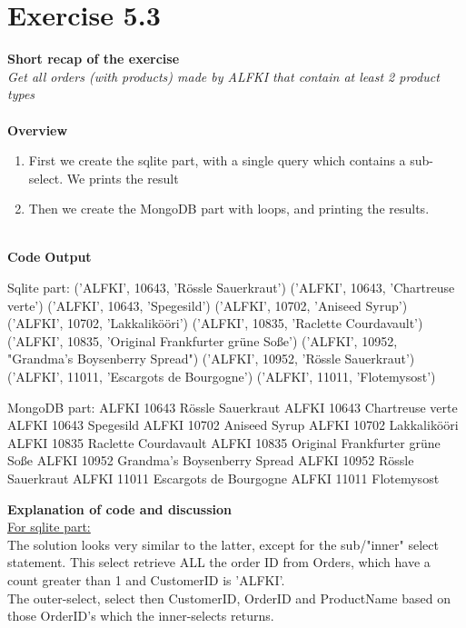 \documentclass{article}
\newcommand\pythonstyle{\lstset{
language=python,
breaklines=true,
basicstyle=\ttfamily\small,
otherkeywords={1, 2, 3, 4, 5, 6, 7, 8 ,9 , 0, -, =, +, [, ], (, \), \{, \}, :, *, !},             %
keywordstyle=\color{blue},
emph={class, pass, in, for, while, if, is, elif, else, not, and, or, OR
    def, print, exec, break, continue, return},
emphstyle=\color{black}\bfseries,
emph={[2]True, False, None, self},
emphstyle=[2]\color{purple},
emph={[3]from, import, as},
emphstyle=[3]\color{blue},
stringstyle=\color{red},
frame=tb,
showstringspaces=false,
morecomment=[s]{"""}{"""},
commentstyle=\color{gray},
rulesepcolor=\color{blue},
title=\lstname
}}
\newcommand\pythonexternal[2][]{{
\pythonstyle
}}
\begin{document}
\section{Exercise 5.3}
\textbf{Short recap of the exercise}\\
\textit{Get all orders (with products) made by ALFKI that contain at least 2 product types}\\
~\\
\textbf{Overview}

\begin{enumerate}
  \item First we create the sqlite part, with a single query which contains a sub-select. We prints the result 
  \item Then we create the MongoDB part with loops, and printing the results. 
\end{enumerate}
~\\
\textbf{Code}
\textbf{Output}
\begin{pythonOutput}
Sqlite part:
('ALFKI', 10643, 'Rössle Sauerkraut')
('ALFKI', 10643, 'Chartreuse verte')
('ALFKI', 10643, 'Spegesild')
('ALFKI', 10702, 'Aniseed Syrup')
('ALFKI', 10702, 'Lakkalikööri')
('ALFKI', 10835, 'Raclette Courdavault')
('ALFKI', 10835, 'Original Frankfurter grüne Soße')
('ALFKI', 10952, "Grandma's Boysenberry Spread")
('ALFKI', 10952, 'Rössle Sauerkraut')
('ALFKI', 11011, 'Escargots de Bourgogne')
('ALFKI', 11011, 'Flotemysost')

MongoDB part:
ALFKI 10643 Rössle Sauerkraut
ALFKI 10643 Chartreuse verte
ALFKI 10643 Spegesild
ALFKI 10702 Aniseed Syrup
ALFKI 10702 Lakkalikööri
ALFKI 10835 Raclette Courdavault
ALFKI 10835 Original Frankfurter grüne Soße
ALFKI 10952 Grandma's Boysenberry Spread
ALFKI 10952 Rössle Sauerkraut
ALFKI 11011 Escargots de Bourgogne
ALFKI 11011 Flotemysost

\end{pythonOutput}
\textbf{Explanation of code and discussion}\\
\underline{For sqlite part:}~\\
The solution looks very similar to the latter, except for the sub/"inner" select statement. This select retrieve ALL the order ID from Orders, which have a count greater than 1 and CustomerID is 'ALFKI'. ~\\
The outer-select, select then CustomerID, OrderID and ProductName based on those OrderID's which the inner-selects returns. 
\end{document}
